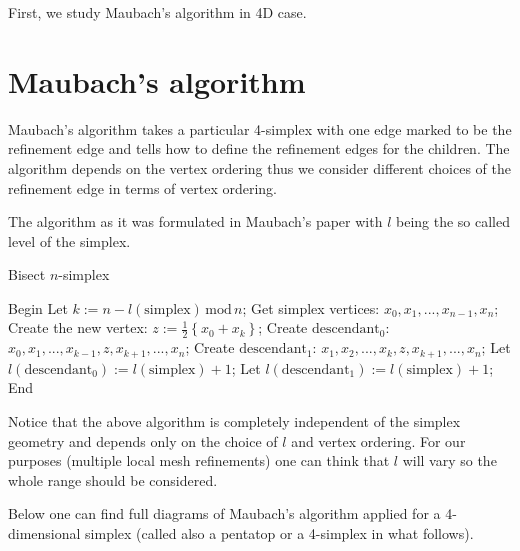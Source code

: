 \documentclass[a4paper,12pt]{amsart}
\numberwithin{equation}{section}
\begin{document}
First, we study Maubach's algorithm in 4D case.

\section{Maubach's algorithm}

Maubach's algorithm takes a particular 4-simplex with one edge marked to be the refinement edge and tells how to define the refinement edges for the children. The algorithm depends on the vertex ordering thus we consider different choices of the refinement edge in terms of vertex ordering.

The algorithm as it was formulated in Maubach's paper with $l$ being the so called level of the simplex.
\begin{algorithm}
    \caption{Bisect $n$-simplex}
    \label{euclid}
    \begin{algorithmic}[1] %
            \State Begin
            \State Let $k:= n - l(\mbox{simplex}) \, \mbox{mod} \, n$;
            \State Get simplex vertices: $x_0, x_1, ..., x_{n-1}, x_n$;
            \State Create the new vertex: $z := \frac{1}{2} \left\{ x_0 + x_k \right\}$;
            \State Create $\mbox{descendant}_0$: $x_0, x_1, ..., x_{k-1}, z, x_{k+1}, ..., x_n$;
            \State Create $\mbox{descendant}_1$: $x_1, x_2, ..., x_k, z, x_{k+1}, ..., x_n$;
            \State Let $l(\mbox{descendant}_0) := l(\mbox{simplex}) + 1$;
            \State Let $l(\mbox{descendant}_1) := l(\mbox{simplex}) + 1$;
            \State End
    \end{algorithmic}
\end{algorithm}
Notice that the above algorithm is completely independent of the simplex geometry and depends only on the choice of $l$ and vertex ordering. For our purposes (multiple local mesh refinements) one can think that $l$ will vary so the whole range should be considered.

Below one can find full diagrams of Maubach's algorithm applied for a 4-dimensional simplex (called also a pentatop or a 4-simplex in what follows).
\end{document}

